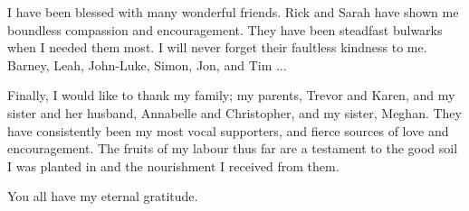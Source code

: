 \begin{acknowledgements}
{I have been blessed with many wonderful friends. Rick and Sarah have shown me 
boundless  compassion and encouragement. They have been steadfast bulwarks when I 
needed them most. I will never forget their faultless kindness to me. Barney, Leah, 
John-Luke, Simon, Jon, and Tim ...

Finally, I would like to thank my family; my parents, Trevor and Karen, and my 
sister and her husband, Annabelle and Christopher, and my sister, Meghan. They
have  consistently been my most vocal supporters, and fierce sources of love and
encouragement. The fruits of my labour thus far are a testament to the good 
soil I was planted in and the nourishment I received from them.

You all have my eternal gratitude.}

\end{acknowledgements}